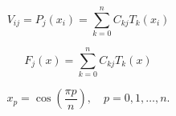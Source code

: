 \documentclass{article}
\begin{document}
\[
V_{ij} = P_j(x_i) = \sum_{k=0}^{n} C_{kj}T_k(x_i)
\]
\pagebreak

\[
F_j(x) = \sum_{k=0}^{n} C_{kj}T_k(x)
\]
\pagebreak

\[
x_p = \cos \left( \frac{\pi p}{n} \right), \quad p = 0, 1, \ldots, n.
\]
\pagebreak
\end{document}
